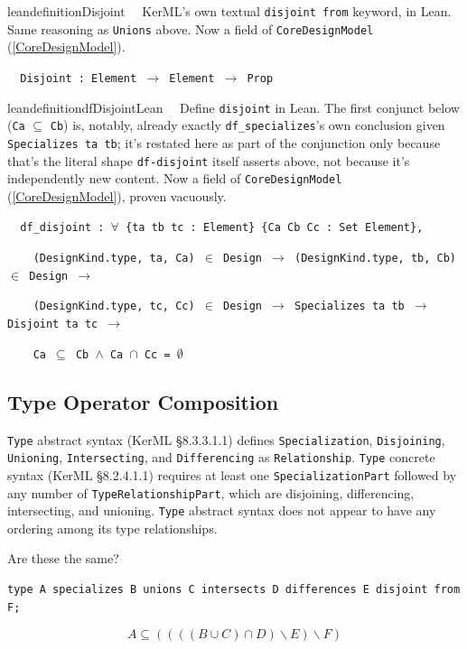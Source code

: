 \begin{restatable}{leandefinition}{Disjoint}~~ KerML's own textual \texttt{disjoint from}
keyword, in Lean. Same reasoning as \texttt{Unions} above. Now a field of \texttt{CoreDesignModel}
(\ref{CoreDesignModel}).

\texttt{~~Disjoint : Element $\to$ Element $\to$ Prop}
\label{Disjoint}
\end{restatable}

\begin{restatable}{leandefinition}{dfDisjointLean}~~ Define \texttt{disjoint} in Lean. The
first conjunct below (\texttt{Ca} $\subseteq$ \texttt{Cb}) is, notably, already exactly \texttt{df\_specializes}'s
own conclusion given \texttt{Specializes ta tb}; it's restated here as part of the conjunction only because
that's the literal shape \texttt{df-disjoint} itself asserts above, not because it's independently new content.
Now a field of \texttt{CoreDesignModel} (\ref{CoreDesignModel}), proven vacuously.

\texttt{~~df\_disjoint : $\forall$ \{ta tb tc : Element\} \{Ca Cb Cc : Set Element\},}

\texttt{~~~~(DesignKind.type, ta, Ca) $\in$ Design $\to$ (DesignKind.type, tb, Cb) $\in$ Design $\to$}

\texttt{~~~~(DesignKind.type, tc, Cc) $\in$ Design $\to$ Specializes ta tb $\to$ Disjoint ta tc $\to$}

\texttt{~~~~Ca $\subseteq$ Cb $\wedge$ Ca $\cap$ Cc = $\emptyset$}
\label{df_disjoint}
\end{restatable}

\subsection{Type Operator Composition}

\pn \texttt{Type} abstract syntax (KerML \S8.3.3.1.1) defines \texttt{Specialization}, \texttt{Disjoining}, \texttt{Unioning}, \texttt{Intersec\-ting}, and \texttt{Differencing} as \texttt{Relationship}.
\texttt{Type} concrete syntax (KerML \S8.2.4.1.1) requires at least one \texttt{SpecializationPart} followed by any number of \texttt{TypeRelationshipPart}, which are disjoining, differencing, 
intersecting, and unioning.
\texttt{Type} abstract syntax does not appear to have any ordering among its type relationships.  

\pn Are these the same?

\begin{lstlisting}
type A specializes B unions C intersects D differences E disjoint from F;
\end{lstlisting}
\[ A \subseteq (((( B \cup C) \cap D)\backslash E)\backslash F) \]

